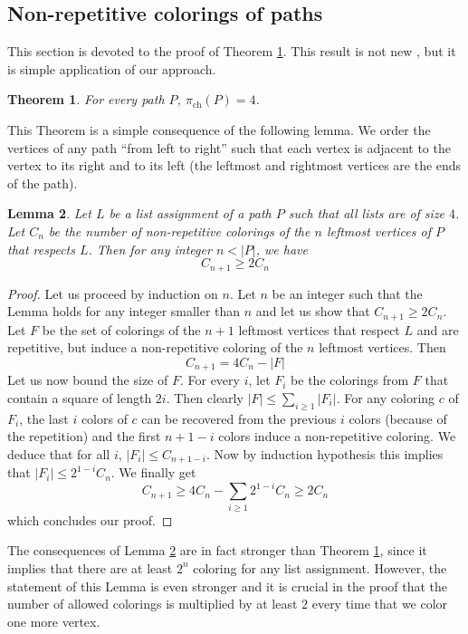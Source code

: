\documentclass[a4paper,10pt]{article}
\newtheorem{theorem}{Theorem}
\newtheorem{lemma}[theorem]{Lemma}
\begin{document}
\subsection{Non-repetitive colorings of paths}
This section is devoted to the proof of Theorem \ref{thmpath}.
This result is not new \cite{doi:10.1002/rsa.20347,10.1002/rsa.20411}, but it is simple application of our approach.
\begin{theorem}\label{thmpath}
For every path $P$, $\pi_{\operatorname{ch}}(P)=4$.
\end{theorem}
This Theorem is a simple consequence of the following lemma.
We order the vertices of any path ``from left to right'' such that each vertex is adjacent to the vertex to its right and to its left (the leftmost and rightmost vertices are the ends of the path).
\begin{lemma}\label{lemmpath}
Let $L$ be a list assignment of a path $P$ such that all lists are of size  $4$.
Let $C_n$ be the number of non-repetitive colorings of the $n$ leftmost vertices of $P$ that respects $L$.
 Then for any integer $n< |P|$, we have
 $$C_{n+1}\ge2C_n$$
\end{lemma}
\begin{proof}
 Let us proceed by induction on $n$. 
 Let $n$ be an integer such that the Lemma holds for any integer smaller than $n$ and let us show that $C_{n+1}\ge2C_n$.
 Let $F$ be the set of colorings of the $n+1$ leftmost vertices that respect $L$ and are repetitive, but induce a non-repetitive coloring of the $n$ leftmost vertices. 
 Then
 \begin{equation}\label{coutingforpath}
  C_{n+1}=4C_n-|F|
 \end{equation}
Let us now bound the size of $F$. 
For every $i$, let $F_i$ be the colorings from $F$ that contain a square of length $2i$. Then clearly $|F|\le \sum_{i\ge1}|F_i|$.
For any coloring $c$ of $F_i$, the last $i$ colors of $c$ can be recovered from the previous $i$ colors (because of the repetition) and the first $n+1-i$ colors induce a non-repetitive coloring. We deduce that for all $i$,
$|F_i|\le C_{n+1-i}$. 
Now by induction hypothesis this implies that $|F_i|\le 2^{1-i}C_{n}$.
We finally get
\begin{equation}\label{conclusionlemmapath}
 C_{n+1}\ge4C_n-\sum_{i\ge1} 2^{1-i}C_{n}\ge 2C_n
\end{equation}
 which concludes our proof.
\end{proof}

The consequences of Lemma \ref{lemmpath} are in fact stronger than Theorem \ref{thmpath}, since it implies that there are at least $2^n$ coloring for any list assignment. However, the statement of this Lemma is even stronger and it is crucial in the proof that the number of allowed colorings is multiplied by at least $2$ every time that we color one more vertex.
\end{document}
